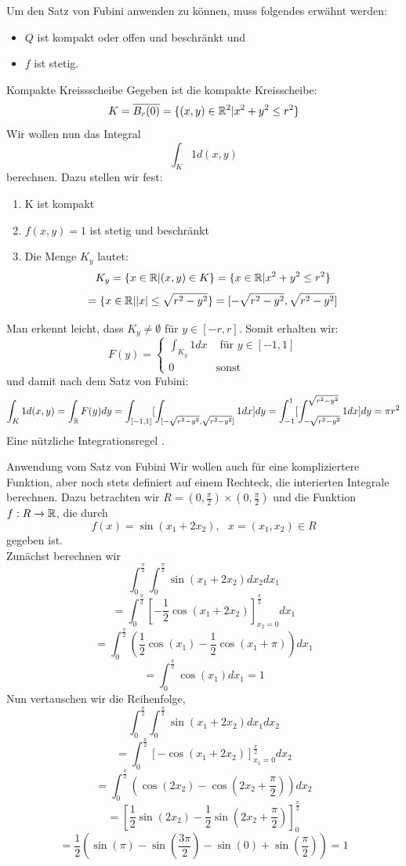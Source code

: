  Um den Satz von Fubini anwenden zu können, muss folgendes erwähnt werden:
\begin{itemize}
    \item $Q$ ist kompakt oder offen und beschränkt und
    \item $f$ ist stetig.
\end{itemize}
\begin{Beispiel}{Kompakte Kreissscheibe}
    Gegeben ist die kompakte Kreisscheibe:
    $$K=\overline{B_r(0)}=\{(x,y)\in\mathbb{R}^2| x^2+y^2\leq r^2\}$$
    Wir wollen nun das Integral
    $$\int_K 1 d(x,y)$$
    berechnen. Dazu stellen wir fest:
    \begin{enumerate}
        \item K ist kompakt
        \item $f(x,y)= 1$ ist stetig und beschränkt
        \item Die Menge $K_y$ lautet:
        $$K_y=\{x\in \mathbb{R}| (x,y)\in K\}=\{ x\in \mathbb{R} | x^2+y^2 \leq r^2\}$$
        $$= \{x\in \mathbb{R} | |x| \leq \sqrt{r^2-y^2}\}=[-\sqrt{r^2-y^2}, \sqrt{r^2-y^2}]$$
    \end{enumerate}
    Man erkennt leicht, dass $K_y\neq \emptyset$ für $y\in [-r, r]$. Somit erhalten wir:
    \begin{equation}
        F(y)=\begin{cases}\int_{K_y} 1dx & \mbox{ für $y\in [-1, 1]$} \\0 & \mbox{sonst}\end{cases}
    \end{equation}
    und damit nach dem Satz von Fubini:
    $$\int_K 1 d(x,y) = \int_{\mathbb{R}} F(y) dy = \int_{[-1,1]}[\int_{[-\sqrt{r^2-y^2}, \sqrt{r^2-y^2}]} 1dx]dy= \int_{-1}^{1} [\int_{-\sqrt{r^2-y^2}}^{\sqrt{r^2-y^2}} 1dx]dy=\pi r^2$$
    Eine nützliche Integrationsregel .
\end{Beispiel}
\begin{Beispiel}{Anwendung vom Satz von Fubini}
Wir wollen auch für eine kompliziertere Funktion, aber noch stets definiert auf einem Rechteck, die interierten Integrale berechnen. Dazu betrachten wir $R=(0,\frac{\pi}{2})\times (0,\frac{\pi}{2})$ und die Funktion $f:R\rightarrow \mathbb{R}$, die durch
$$f(x)=\sin(x_1+2x_2), \mbox{ $x=(x_1,x_2)\in R$}$$
gegeben ist. \\
Zunächst berechnen wir
$$\int_0^{\frac{\pi}{2}}\int_0^{\frac{\pi}{2}} \sin(x_1+2x_2)dx_2dx_1$$
$$=\int_0^{\frac{\pi}{2}}[-\frac{1}{2}\cos(x_1+2x_2)]^{\frac{\pi}{2}}_{x_2=0}dx_1$$
$$=\int_0^{\frac{\pi}{2}}(\frac{1}{2}\cos(x_1)-\frac{1}{2}\cos(x_1+\pi))dx_1$$
$$=\int_0^{\frac{\pi}{2}}\cos(x_1)dx_1 = 1$$
Nun vertauschen wir die Reihenfolge,
$$\int_0^{\frac{\pi}{2}}\int_0^{\frac{\pi}{2}} \sin(x_1+2x_2)dx_1dx_2$$
$$=\int_0^{\frac{\pi}{2}} [-\cos(x_1+2x_2)]^{\frac{\pi}{2}}_{x_1=0}dx_2$$
$$=\int_0^{\frac{\pi}{2}} (\cos(2x_2)-\cos(2x_2+\frac{\pi}{2}))dx_2$$
$$=[\frac{1}{2}\sin(2x_2)-\frac{1}{2}\sin(2x_2+\frac{\pi}{2})]_0^{\frac{\pi}{2}}$$
$$=\frac{1}{2}(\sin(\pi)-\sin(\frac{3\pi}{2})-\sin(0)+\sin(\frac{\pi}{2})) = 1$$
\end{Beispiel}
